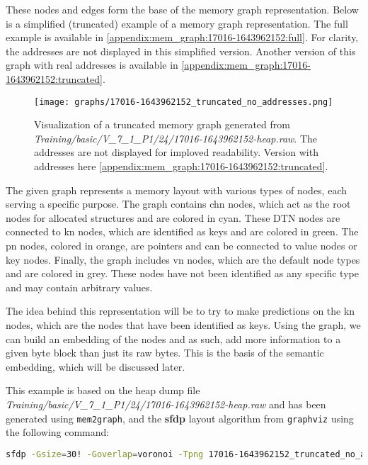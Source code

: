 These nodes and edges form the base of the memory graph representation. Below is a simplified (truncated) example of a memory graph representation. The full example is available in \ref{appendix:mem_graph:17016-1643962152:full}. For clarity, the addresses are not displayed in this simplified version. Another version of this graph with real addresses is available in \ref{appendix:mem_graph:17016-1643962152:truncated}.

\begin{figure}[H]\label{methods:mem_graph:17016-1643962152:simplified}
    \centering
    \texttt{[image: graphs/17016-1643962152\_truncated\_no\_addresses.png]}
    \caption{Visualization of a truncated memory graph generated from \textit{Training/basic/V\_7\_1\_P1/24/17016-1643962152-heap.raw}. The addresses are not displayed for imploved readability. Version with addresses here \ref{appendix:mem_graph:17016-1643962152:truncated}.}
\end{figure}

The given graph represents a memory layout with various types of nodes, each serving a specific purpose. The graph contains \gls{chn} nodes, which act as the root nodes for allocated structures and are colored in cyan. These DTN nodes are connected to \gls{kn} nodes, which are identified as keys and are colored in green. The \gls{pn} nodes, colored in orange, are pointers and can be connected to value nodes or key nodes. Finally, the graph includes \gls{vn} nodes, which are the default node types and are colored in grey. These nodes have not been identified as any specific type and may contain arbitrary values.

The idea behind this representation will be to try to make predictions on the \gls{kn} nodes, which are the nodes that have been identified as keys. Using the graph, we can build an embedding of the nodes and as such, add more information to a given byte block than just its raw bytes. This is the basis of the semantic embedding, which will be discussed later.

This example is based on the heap dump file \textit{Training/basic/V\_7\_1\_P1/24/17016-1643962152-heap.raw} and has been generated using \texttt{mem2graph}, and the \textbf{sfdp} layout algorithm from \texttt{graphviz} using the following command:

\begin{lstlisting}[language=bash, caption={Command used to generate the memory graph visualization of \textit{Training/basic/V\_7\_1\_P1/24/17016-1643962152-heap.raw}}]
    sfdp -Gsize=30! -Goverlap=voronoi -Tpng 17016-1643962152_truncated_no_addresses.gv > 17016-1643962152_truncated_no_addresses.png
\end{lstlisting}

